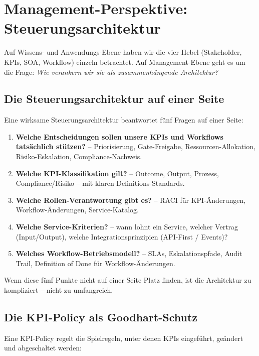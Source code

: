 \documentclass[11pt,a4paper,oneside]{article}
\begin{document}
\section{Management-Perspektive: Steuerungsarchitektur}

Auf Wissens- und Anwendungs-Ebene haben wir die vier Hebel (Stakeholder, KPIs, SOA, Workflow) einzeln betrachtet. Auf Management-Ebene geht es um die Frage: \emph{Wie verankern wir sie als zusammen­hängende Architektur?}

\subsection{Die Steuerungsarchitektur auf einer Seite}

Eine wirksame Steuerungsarchitektur beantwortet fünf Fragen auf einer Seite:

\begin{enumerate}
  \item \textbf{Welche Entscheidungen sollen unsere KPIs und Workflows tatsächlich stützen?} -- Priorisierung, Gate-Freigabe, Ressourcen-Allokation, Risiko-Eskalation, Compliance-Nachweis.
  \item \textbf{Welche KPI-Klassifikation gilt?} -- Outcome, Output, Prozess, Compliance/Risiko -- mit klaren Definitions-Standards.
  \item \textbf{Welche Rollen-Verantwortung gibt es?} -- RACI für KPI-Änderungen, Workflow-Änderungen, Service-Katalog.
  \item \textbf{Welche Service-Kriterien?} -- wann lohnt ein Service, welcher Vertrag (Input/Output), welche Integrationsprinzipien (API-First / Events)?
  \item \textbf{Welches Workflow-Betriebsmodell?} -- SLAs, Eskalationspfade, Audit Trail, Definition of Done für Workflow-Änderungen.
\end{enumerate}

Wenn diese fünf Punkte nicht auf einer Seite Platz finden, ist die Architektur zu kompliziert -- nicht zu umfangreich.

\subsection{Die KPI-Policy als Goodhart-Schutz}

Eine KPI-Policy regelt die Spielregeln, unter denen KPIs eingeführt, geändert und abgeschaltet werden:
\end{document}
